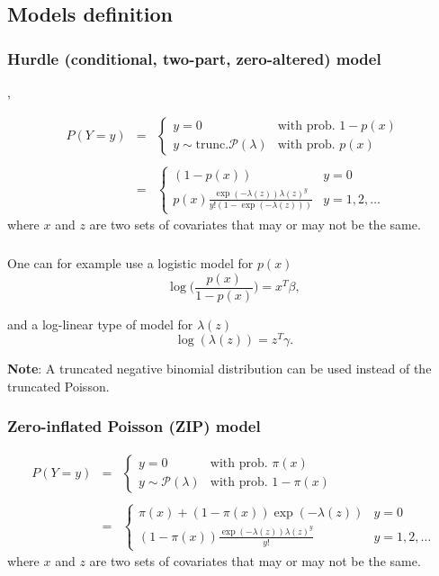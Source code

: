 \documentclass{beamer}
\newcommand{\bs}{\bigskip}
\begin{document}
\subsection{Models definition}
\begin{frame}
\frametitle{Hurdle (conditional, two-part, zero-altered) model}

, 

\begin{eqnarray*}
P(Y=y) & = & \left\{ \begin{array}{ll}
y=0 & \mbox{with prob. } 1-p(x)\\
y \sim \mbox{trunc.} {\mathcal P}(\lambda) & \mbox{with prob. } p(x)
\end{array} \right.\\
& & \\
& = &  \left\{
\begin{array}{ll}
(1-p(x))  & y=0\\
p(x) \frac{\exp(-\lambda(z)) \lambda(z)^y}{y! (1-\exp(-\lambda(z)))} & y=1,2,\ldots
\end{array} \right.
\end{eqnarray*}
where $x$ and $z$ are two sets of covariates that may or may not be
the same.
\end{frame}

\begin{frame}
\frametitle{}
One can for example use a logistic model for $p(x)$
$$ \log \Big(\frac{p(x)}{1-p(x)} \Big) = x^T
\beta,$$

and a log-linear type of model for $\lambda(z)$
$$\log(\lambda(z)) = z^T \gamma.$$

\bs
\textbf{Note}: A truncated negative binomial distribution can be used instead of
the truncated Poisson. 

\end{frame}

\begin{frame}
\frametitle{Zero-inflated Poisson (ZIP) model}



\begin{eqnarray*}
P(Y=y)  & = & \left\{ \begin{array}{ll}
y=0 & \mbox{with prob. } \pi(x)\\
y \sim {\mathcal P}(\lambda) & \mbox{with prob. } 1-\pi(x)
\end{array} \right. \\
& & \\
& = &  \left\{
\begin{array}{ll}
\pi(x) + (1-\pi(x)) \exp(-\lambda(z)) & y=0\\
(1-\pi(x)) \frac{\exp(-\lambda(z)) \lambda(z)^{y}}{y!} & y=1,2,\ldots
\end{array} \right.
\end{eqnarray*}
where $x$ and $z$ are two sets of covariates that may or may not be
the same.
\end{frame}
\end{document}
